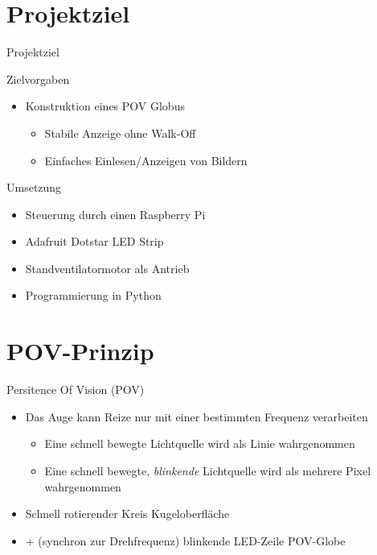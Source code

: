 \begin{frame}[label=title]{}
\titlepage
\end{frame}
\begin{frame}[label=title]{}
\tableofcontents
\end{frame}

\section{Projektziel}
\begin{frame}{Projektziel}
\begin{exampleblock}{Zielvorgaben}
\begin{itemize}
\item Konstruktion eines POV Globus
\begin{itemize}
\item Stabile Anzeige ohne Walk-Off
\item Einfaches Einlesen/Anzeigen von Bildern
\end{itemize}
\end{itemize}
\end{exampleblock}
\vspace{0.5cm}
\begin{exampleblock}{Umsetzung}
\begin{itemize}
\item Steuerung durch einen Raspberry Pi
\item Adafruit Dotstar LED Strip
\item Standventilatormotor als Antrieb
\item Programmierung in Python
\end{itemize}
\end{exampleblock}
\end{frame}

\section{POV-Prinzip}
\begin{frame}{Persitence Of Vision (POV)}
\begin{exampleblock}{}
\begin{itemize}
\item Das Auge kann Reize nur mit einer bestimmten Frequenz verarbeiten
\begin{itemize}
\item[]\Rightarrow Eine schnell bewegte Lichtquelle wird als Linie wahrgenommen
\item[]\Rightarrow Eine schnell bewegte, \emph{blinkende} Lichtquelle wird als mehrere Pixel wahrgenommen
\end{itemize}
\item Schnell rotierender Kreis \Rightarrow Kugeloberfläche
\item + (synchron zur Drehfrequenz) blinkende LED-Zeile \Rightarrow POV-Globe 
\end{itemize}
\end{exampleblock}
\end{frame}

